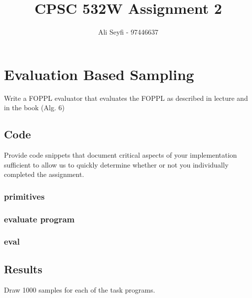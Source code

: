 \documentclass{article}
\def\blu#1{{\color{blu}#1}}
\begin{document}
\title{\vspace{-20mm}
CPSC 532W Assignment 2}
\author{Ali Seyfi - 97446637}
\date{}
\maketitle

\section{Evaluation Based Sampling}

\blu{Write a FOPPL evaluator that evaluates the FOPPL as described in lecture and in the book (Alg. 6)}

\subsection{Code}
\blu{Provide code snippets that document critical aspects of your implementation sufficient to allow us to quickly determine whether or not you individually completed the assignment.}
\subsubsection{primitives}
\label{primitives}

\pagebreak

\pagebreak


\pagebreak
\subsubsection{evaluate program}

\subsubsection{eval}

\subsection{Results}
\blu{Draw 1000 samples for each of the task programs.}
\end{document}
